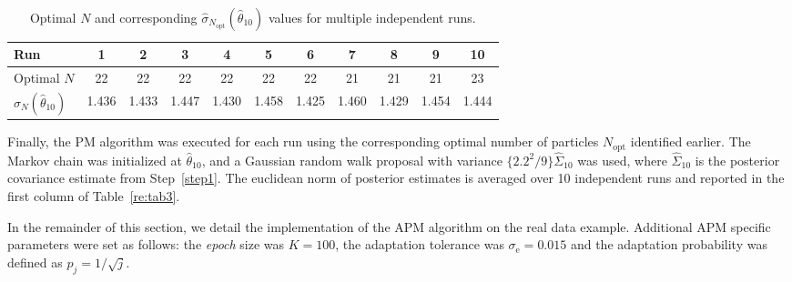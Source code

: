 \documentclass[pdflatex,sn-mathphys-num]{sn-jnl}
\theoremstyle{thmstyleone}
\theoremstyle{thmstyletwo}
\theoremstyle{thmstylethree}
\begin{document}
\begin{table}[h]
\centering
\caption{Optimal $N$ and corresponding $\hat\sigma_{N_{\text{opt}}}(\hat\theta_{10})$ values for multiple independent runs.}
\label{tab:optimal_N_sigma2}
\begin{tabular}{@{}l *{10}{c} @{}}
\toprule
 {Run} & 1 & 2 & 3 & 4 & 5 & 6 & 7 & 8 & 9 & 10 \\
\hline
{Optimal} ${N}$ & 22 & 22 & 22 & 22 & 22 & 22 & 21 & 21 & 21 & 23 \\
$\hat{\sigma}_{N}{(\hat\theta_{10})}$ & 1.436 & 1.433 & 1.447 & 1.430 & 1.458 & 1.425 & 1.460 & 1.429 & 1.454 & 1.444 \\
\bottomrule
\end{tabular}
\end{table}

Finally, the PM algorithm was executed for each run using the corresponding optimal number of particles \( N_{\text{opt}} \) identified earlier. The Markov chain was initialized at \( \hat{\theta}_{10} \), and a Gaussian random walk proposal with variance \( \{2.2^2/9\} \widehat{\Sigma}_{10} \) was used, where \( \widehat{\Sigma}_{10} \) is the posterior covariance estimate from Step~\ref{step1}. The euclidean norm of posterior estimates is averaged over 10 independent runs and reported in the first column of Table~\ref{re:tab3}. 

In the remainder of this section, we detail the implementation of the APM algorithm on the real data example. Additional APM specific parameters were set as follows: the \textit{epoch} size was \( K = 100 \), the adaptation tolerance was \( \sigma_\text{e} = 0.015 \) and the adaptation probability was defined as \( p_j = 1/\sqrt{j} \).
\end{document}
